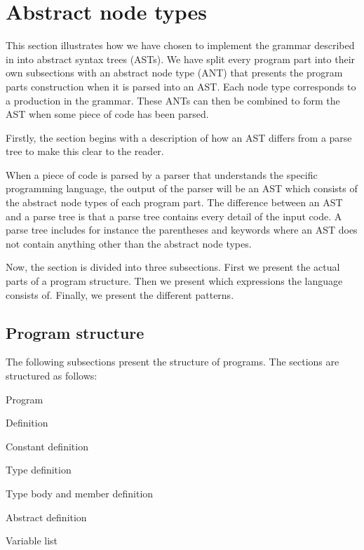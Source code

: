 \section{Abstract node types}
\label{sec:ant}

This section illustrates how we have chosen to implement the grammar described in
 into abstract syntax trees (ASTs). 
We have split every program part into their own subsections with an abstract
node type (ANT) that presents the program parts construction when it is parsed into an
AST. Each node type corresponds to a production in the grammar. These ANTs can
then be combined to form the AST when some piece of code has been parsed.

Firstly, the section begins with a description of how an AST differs from a parse tree 
to make this clear to the reader.

When a piece of code is parsed by a parser that understands the specific programming 
language, the output of the parser will be an AST which consists of the abstract node 
types of each program part. The difference between an AST and a parse tree is that a 
parse tree contains every detail of the input code. A parse tree includes for instance
the parentheses and keywords where an AST does not contain anything other than the 
abstract node types.\cite{parsevsast}

Now, the section is divided into three subsections. First we present the actual
parts of a program structure. Then we present which expressions the language
consists of. Finally, we present the different patterns.

\subsection{Program structure}
The following subsections present the structure of programs. The sections are 
structured as follows:

\begin{dlist}
  \item Program
  \item Definition
  \item Constant definition
  \item Type definition
  \item Type body and member definition
  \item Abstract definition
  \item Variable list
\end{dlist}

